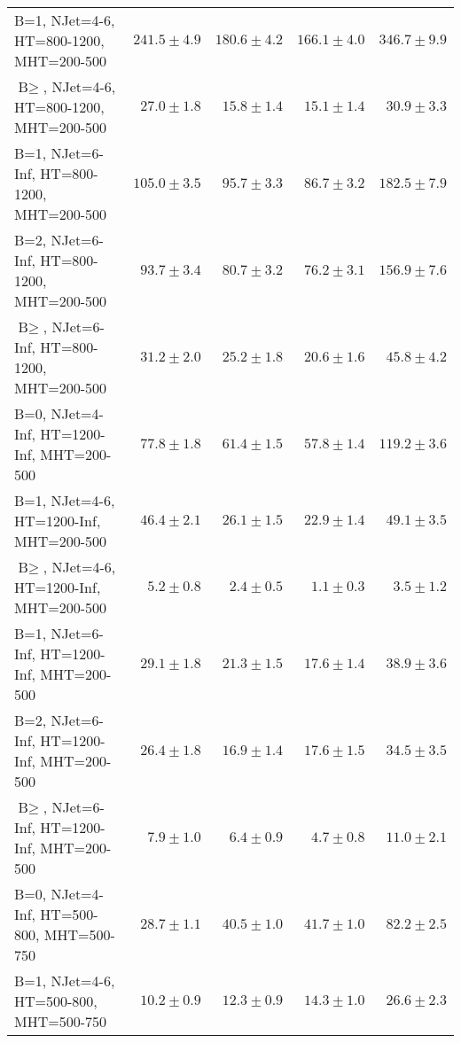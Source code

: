 \begin{table}
\begin{tabular}{l|r|r|r|r}
    B=1, NJet=4-6, HT=800-1200, MHT=200-500 &             $241.5\pm4.9$&             $180.6\pm4.2$&             $166.1\pm4.0$&                 $346.7\pm9.9$ \\ 
    $\text{B}\geq$, NJet=4-6, HT=800-1200, MHT=200-500 &              $27.0\pm1.8$&              $15.8\pm1.4$&              $15.1\pm1.4$&                  $30.9\pm3.3$ \\ 
    B=1, NJet=6-Inf, HT=800-1200, MHT=200-500 &             $105.0\pm3.5$&              $95.7\pm3.3$&              $86.7\pm3.2$&                 $182.5\pm7.9$ \\ 
    B=2, NJet=6-Inf, HT=800-1200, MHT=200-500 &              $93.7\pm3.4$&              $80.7\pm3.2$&              $76.2\pm3.1$&                 $156.9\pm7.6$ \\ 
    $\text{B}\geq$, NJet=6-Inf, HT=800-1200, MHT=200-500 &              $31.2\pm2.0$&              $25.2\pm1.8$&              $20.6\pm1.6$&                  $45.8\pm4.2$ \\ 
    B=0, NJet=4-Inf, HT=1200-Inf, MHT=200-500 &              $77.8\pm1.8$&              $61.4\pm1.5$&              $57.8\pm1.4$&                 $119.2\pm3.6$ \\ 
    B=1, NJet=4-6, HT=1200-Inf, MHT=200-500 &              $46.4\pm2.1$&              $26.1\pm1.5$&              $22.9\pm1.4$&                  $49.1\pm3.5$ \\ 
    $\text{B}\geq$, NJet=4-6, HT=1200-Inf, MHT=200-500 &               $5.2\pm0.8$&               $2.4\pm0.5$&               $1.1\pm0.3$&                   $3.5\pm1.2$ \\ 
    B=1, NJet=6-Inf, HT=1200-Inf, MHT=200-500 &              $29.1\pm1.8$&              $21.3\pm1.5$&              $17.6\pm1.4$&                  $38.9\pm3.6$ \\ 
    B=2, NJet=6-Inf, HT=1200-Inf, MHT=200-500 &              $26.4\pm1.8$&              $16.9\pm1.4$&              $17.6\pm1.5$&                  $34.5\pm3.5$ \\ 
    $\text{B}\geq$, NJet=6-Inf, HT=1200-Inf, MHT=200-500 &               $7.9\pm1.0$&               $6.4\pm0.9$&               $4.7\pm0.8$&                  $11.0\pm2.1$ \\ 
    B=0, NJet=4-Inf, HT=500-800, MHT=500-750 &              $28.7\pm1.1$&              $40.5\pm1.0$&              $41.7\pm1.0$&                  $82.2\pm2.5$ \\ 
    B=1, NJet=4-6, HT=500-800, MHT=500-750 &              $10.2\pm0.9$&              $12.3\pm0.9$&              $14.3\pm1.0$&                  $26.6\pm2.3$ \\ 

\end{tabular}
\end{table}
